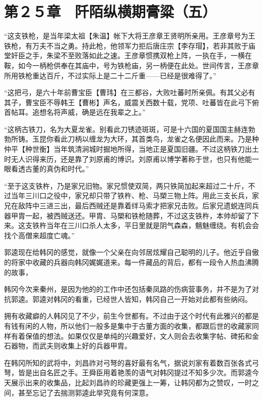 \section{第２５章　阡陌纵横期膏粱（五）}

“这支铁枪，是当年梁太祖【朱温】帐下大将王彦章王贤明所亲用。王彦章号为王铁枪，有万夫不当之勇。持此枪，他领军力拒后唐庄宗【李存瑁】，若非其败于庙堂奸臣之手，朱梁不至败落如此之速。王彦章惯携双枪上阵，一执在手，一横在鞍，如今一柄枪供奉在其庙中，号为铁枪庙，另一柄便在此处。世间传言，王彦章所用铁枪重达百斤，不过实际上是二十二斤重——已经是很难得了。”

“这把弓，是六十年前曹宝臣【曹玮】在三都谷，大败吐蕃时所亲佩。有其父必有其子，曹宝臣不辱韩王【曹彬】声名，威震关西数十载，党项、吐蕃皆在此弓下俯首帖耳。追想名将声威，确是远在我辈之上。”

“这柄古铁刀，名为大夏龙雀。别看此刀锈迹斑斑，可是十六国的夏国国主赫连勃勃所铸。玉昆你看此刀柄以缠龙为大环，其首类鸟，龙雀之名便因此而来。乃是种仲平【种世衡】当年筑清涧城时掘地所得，当地正是夏国旧疆。不过这柄铁刀出土时无人识得来历，还是靠了刘原甫的博识。刘原甫以博学著称于世，也只有他能一眼看透古董的真伪和时代。”

“至于这支铁杵，乃是家兄旧物。家兄惯使双简，两只铁简加起来超过二十斤，不过当年三川口之役中，家兄却只带了铁杵、枪、马槊三物上阵。用此三支长兵，家兄在敌阵中三进三出，最后西贼还是靠着绊马索才把家兄击败。后家兄遗蜕连同兵器甲胄一起，被西贼送还。甲胄、马槊和铁枪随葬，不过这支铁杵，本帅却留了下来。这支铁杵当年在三川口杀人太多，平日里就是阴气森森，魑魅缠绕。有机会会找个高僧来超度亡魂。”

郭逵现在给韩冈的感觉，就像一个父亲在向邻居炫耀自己聪明的儿子。他近乎自傲的将家中收藏的兵器向韩冈娓娓道来。每一件藏品的背后，都有一段令人热血沸腾的故事，

韩冈今次来秦州，是因为他的的工作中还包括秦凤路的伤病营事务，并不是为了对抗郭逵。郭逵对韩冈的看重，已经世人皆知，韩冈自己一开始对此都有些纳闷。

拥有收藏癖的人韩冈见了不少，前生今世都有。不过由于这个时代有此雅兴的都是有钱有闲的人物，所以他们一般多是集中于古董方面的收集，都跟后世的收藏家同样有着保值的想法。如果仅仅是单纯的兴趣爱好，文人则会去收集字帖、碑拓和金石器物，而武夫则收集上好的兵器甲胄。

在韩冈所知的武将中，刘昌祚对弓弩的喜好最有名气，据说刘家有着数百张各式弓弩，皆是出自名匠之手。王舜臣用着艳羡的语气对韩冈提过不知多少次。而郭逵今天展示出来的收集品，比起刘昌祚的珍藏更强上一筹，让韩冈都为之赞叹，一时之间，甚至忘记了去揣测郭逵此举究竟有何深意。

